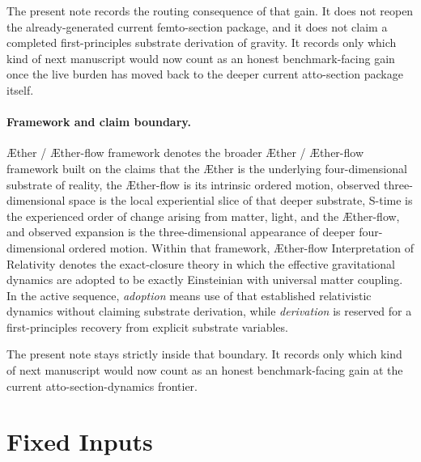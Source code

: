 \documentclass[11pt]{article}
\newcommand{\Aether}{\AE{}ther}
\newcommand{\Aflow}{\AE{}ther-flow}
\newcommand{\TheoryName}{\Aflow{} Interpretation of Relativity}
\newcommand{\TheoryProgram}{\Aether{} / \Aflow{} framework}
\begin{document}
The present note records the routing consequence of that gain. It does not reopen the already-generated current femto-section package, and it does not claim a completed first-principles substrate derivation of gravity. It records only which kind of next manuscript would now count as an honest benchmark-facing gain once the live burden has moved back to the deeper current atto-section package itself.

\paragraph{Framework and claim boundary.}
\TheoryProgram{} denotes the broader \Aether{} / \Aflow{} framework built on the claims that the \Aether{} is the underlying four-dimensional substrate of reality, the \Aflow{} is its intrinsic ordered motion, observed three-dimensional space is the local experiential slice of that deeper substrate, S-time is the experienced order of change arising from matter, light, and the \Aflow{}, and observed expansion is the three-dimensional appearance of deeper four-dimensional ordered motion. Within that framework, \TheoryName{} denotes the exact-closure theory in which the effective gravitational dynamics are adopted to be exactly Einsteinian with universal matter coupling. In the active sequence, \emph{adoption} means use of that established relativistic dynamics without claiming substrate derivation, while \emph{derivation} is reserved for a first-principles recovery from explicit substrate variables.

The present note stays strictly inside that boundary. It records only which kind of next manuscript would now count as an honest benchmark-facing gain at the current atto-section-dynamics frontier.

\section{Fixed Inputs}
\end{document}
